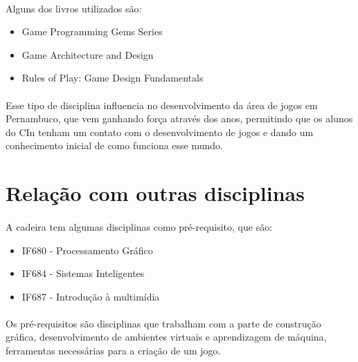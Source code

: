 \documentclass[10pt]{article}
\begin{document}
\paragraph{} Alguns dos livros utilizados são:
\begin{itemize}
    \item Game Programming Gems Series \cite {deloura2001game}
    \item Game Architecture and Design \cite {rollings1999game}
    \item Rules of Play: Game Design Fundamentals \cite {salen2004rules}
\end{itemize}
\paragraph{} Esse tipo de disciplina influencia no desenvolvimento da área de jogos em Pernambuco, que vem ganhando força através dos anos, permitindo que os alunos do CIn tenham um contato com o desenvolvimento de jogos e dando um conhecimento inicial de como funciona esse mundo.

\section {Relação com outras disciplinas}
\paragraph{} A cadeira tem algumas disciplinas como pré-requisito, que são:
\begin{itemize}
    \item IF680 - Processamento Gráfico
    \item IF684 - Sistemas Inteligentes
    \item IF687 - Introdução à multimídia
 \end{itemize}
\paragraph{} Os pré-requisitos são disciplinas que trabalham com a parte de construção gráfica, desenvolvimento de ambientes virtuais e aprendizagem de máquina, ferramentas necessárias para a criação de um jogo.


\printbibliography
\end{document}
